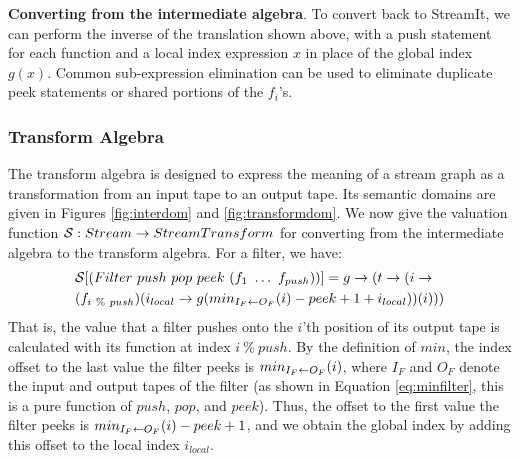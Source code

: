 {\bf Converting from the intermediate algebra}.  To convert back to
StreamIt, we can perform the inverse of the translation shown above,
with a push statement for each function and a local index expression $x$
in place of the global index $g(x)$.  Common sub-expression elimination
can be used to eliminate duplicate peek statements or shared portions of
the $f_i$'s.

\subsubsection{Transform Algebra}

The transform algebra is designed to express the meaning of a stream
graph as a transformation from an input tape to an output tape.  Its
semantic domains are given in Figures \ref{fig:interdom} and
\ref{fig:transformdom}.  We now give the valuation function ${\cal S}:
Stream \ra StreamTransform$ for converting from the intermediate
algebra to the transform algebra.  For a filter, we have:
\begin{align*}
&{\cal S} [(Filter~push~pop~peek~(f_1~\dots~f_{push}))] = g \ra (t \ra
(i \ra \\ &(f_{i~\%~push})(i_{local} \ra g(\mi{I_F}{O_F}(i) - peek + 1 + 
i_{local}))(i)))
\end{align*}
That is, the value that a filter pushes onto the $i$'th position of its
output tape is calculated with its function at index $i~\%~push$.  By
the definition of $min$, the index offset to the last value the filter
peeks is $min_{I_F \leftarrow O_F}(i)$, where $I_F$ and $O_F$ denote the input and
output tapes of the filter (as shown in Equation \ref{eq:minfilter},
this is a pure function of $push$, $pop$, and $peek$).  Thus, the offset
to the first value the filter peeks is $min_{I_F \leftarrow O_F}(i) - peek + 1$,
and we obtain the global index by adding this offset to the local index
$i_{local}$. 

